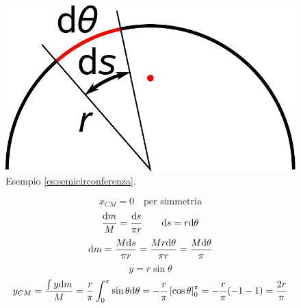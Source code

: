 \begin{Es}[semicirconferenza]
  \label{es:semicirconferenza}
  \begin{figure}[htp]
    \centering
    \includegraphics[scale=0.4]{immagini/fisica1/semicerchio}
    \caption{Esempio \ref{es:semicirconferenza}.}
  \end{figure}

  \[x_{CM}=0 \quad\text{per simmetria}\]
  \[\frac{\mathrm{d} m}{M}=\frac{\mathrm{d} s}{\pi r}\qquad \mathrm{d} s=r\mathrm{d}\theta\]
  \[\mathrm{d} m=\frac{M\mathrm{d} s}{\pi r}=\frac{Mr\mathrm{d}\theta}{\pi r}=\frac{M\mathrm{d}\theta}{\pi}\]
  \[y=r \sin \theta\]
  \[y_{CM}=\frac{\int y\mathrm{d} m}{M}=\frac{r}{\pi}\int_0^\pi \sin\theta \mathrm{d} \theta=-\frac{r}{\pi}\left[\cos\theta\right]_0^\pi=-\frac{r}{\pi}(-1-1)=\frac{2r}{\pi}\]
\end{Es}

